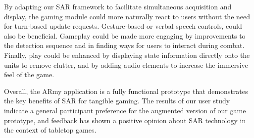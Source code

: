 \documentclass[10pt,twocolumn,letterpaper]{article}
\begin{document}
By adapting our SAR framework to facilitate
simultaneous acquisition and display, the gaming module could more
naturally react
to users without the need for turn-based update requests.
Gesture-based or verbal speech controls, could also be beneficial.
Gameplay could be made more engaging by improvements to the detection
sequence and in finding ways for users to interact during combat.
%
Finally, play could be enhanced by displaying state information
directly onto the units to remove clutter, and by adding audio
elements to increase the immersive feel of the game.

Overall, the ARmy application is a fully functional prototype that
demonstrates the key benefits of SAR for tangible gaming.
The results of our user study indicate a general participant
preference for the augmented version of our game prototype, and
feedback has shown a positive opinion about SAR technology in the
context of tabletop games.



{\footnotesize


}
\end{document}
